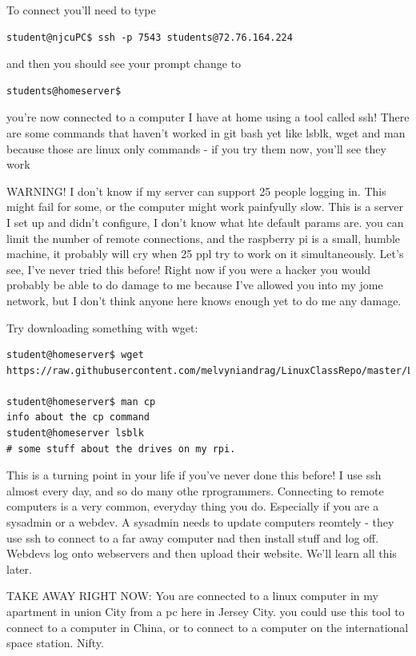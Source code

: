 \documentclass[10pt]{article}
\begin{document}
To connect you'll need to type

\begin{lstlisting}[style=term]
student@njcuPC$ ssh -p 7543 students@72.76.164.224
\end{lstlisting}

and then you should see your prompt change to 

\begin{lstlisting}[style=term]
students@homeserver$
\end{lstlisting}

you're now connected to a computer I have at home using a tool called ssh! There
are some commands that haven't worked in git bash yet like lsblk, wget and man
because those are linux only commands - if you try them now, you'll see they
work

{\LARGE WARNING! I don't know if my server can support 25 people logging in.
This might fail for some, or the computer might work painfyully slow. This is a
server I set up and didn't configure, I don't know what hte default params are.
you can limit the number of remote connections, and the raspberry pi is a small,
humble machine, it probably will cry when 25 ppl try to work on it
simultaneously. Let's see, I've never tried this before! Right now if you were a
hacker you would probably be able to do damage to me because I've allowed you
into my jome network, but I don't think anyone here knows enough yet to do me
any damage.}

Try downloading something with wget:

\begin{lstlisting}
student@homeserver$ wget
https://raw.githubusercontent.com/melvyniandrag/LinuxClassRepo/master/Lectures/Week03_SSHandMoreBash/a.txt

student@homeserver$ man cp
info about the cp command
student@homeserver lsblk
# some stuff about the drives on my rpi.
\end{lstlisting}

This is a turning point in your life if you've never done this before! I use ssh
almost every day, and so do many othe rprogrammers. Connecting to remote
computers is a very common, everyday thing you do. Especially if you are a
sysadmin or a webdev. A sysadmin needs to update computers reomtely - they use
ssh to connect to a far away computer nad then install stuff and log off.
Webdevs log onto webservers and then upload their website. We'll learn all this
later.

TAKE AWAY RIGHT NOW: You are connected to a linux computer in my apartment in
union City from a pc here in Jersey City. you could use this tool to connect to
a computer in China, or to connect to a computer on the international space
station. Nifty.
\end{document}
